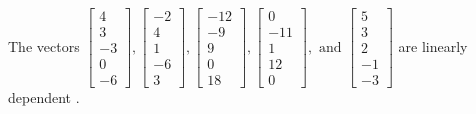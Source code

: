 \begin{exercise}
\begin{exerciseStatement}
  \end{exerciseStatement}
  \begin{exerciseAnswer}
   The vectors \(\left[\begin{array}{r}
4 \\
3 \\
-3 \\
0 \\
-6
\end{array}\right] , \left[\begin{array}{r}
-2 \\
4 \\
1 \\
-6 \\
3
\end{array}\right] , \left[\begin{array}{r}
-12 \\
-9 \\
9 \\
0 \\
18
\end{array}\right] , \left[\begin{array}{r}
0 \\
-11 \\
1 \\
12 \\
0
\end{array}\right] , \text{ and } \left[\begin{array}{r}
5 \\
3 \\
2 \\
-1 \\
-3
\end{array}\right]\) are 
  	 linearly dependent  .
  


  \end{exerciseAnswer}
\end{exercise}